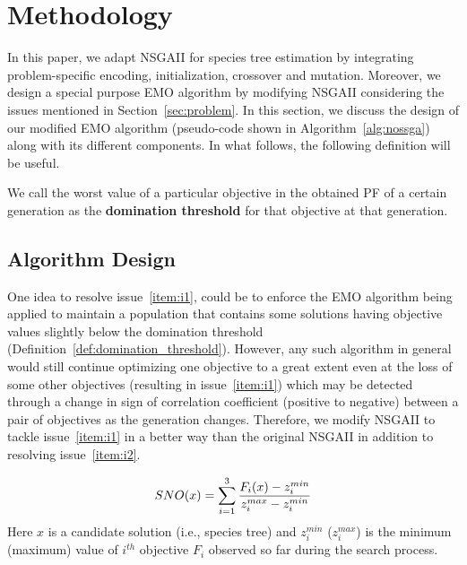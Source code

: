 \section{Methodology}
\label{sec:method}
In this paper, we adapt NSGAII for species tree estimation by integrating problem-specific encoding, initialization, crossover and mutation. Moreover, we design a special purpose EMO algorithm by modifying NSGAII considering the issues mentioned in Section~\ref{sec:problem}. In this section, we discuss the design of our modified EMO algorithm (pseudo-code shown in Algorithm~\ref{alg:nossga}) along with its different components. In what follows, the following definition will be useful. %

\begin{definition}\label{def:domination_threshold}
	\small
	We call the worst value of a particular objective in the obtained PF of a certain generation as the \textbf{domination threshold} for that objective at that generation.
\end{definition}

\subsection{Algorithm Design}
One idea to resolve issue~\ref{item:i1}, could be to enforce the EMO algorithm being applied to maintain a population that contains some solutions having objective values slightly below the domination threshold (Definition~\ref{def:domination_threshold}). However, any such algorithm in general would still
continue optimizing one objective to a great extent even at the loss of some other objectives (resulting in issue~\ref{item:i1}) which may be detected through a change in sign of correlation coefficient (positive to negative)  between a pair of objectives as the generation changes. 
Therefore, we modify NSGAII to tackle issue~\ref{item:i1} in a better way than the original NSGAII in addition to resolving issue~\ref{item:i2}.  

\begin{equation}\label{eqn:nos}
\small
SNO(x) = \sum_{i=1}^{3} \frac{F_i(x)-z_i^{min}}{z_i^{max}-z_i^{min}}
\end{equation}
Here $x$ is a candidate solution (i.e., species tree) and $z_i^{min}$ ($z_i^{max}$) is the minimum (maximum) value of $i^{th}$ objective $F_i$ observed so far during the search process.

